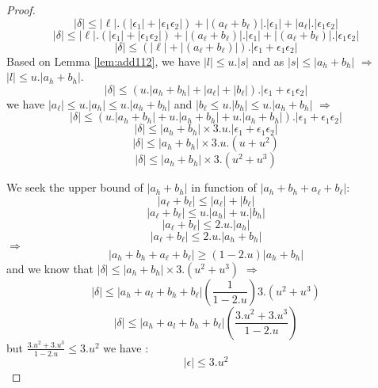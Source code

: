\begin{proof}
$$ \lvert \delta \rvert \le \lvert \ell \rvert .( \lvert \epsilon_1 \rvert+  \lvert \epsilon_1 \epsilon_2\rvert) + \lvert (a_{\ell} + b_{\ell}) \rvert. \lvert \epsilon_1 \rvert + \lvert  a_{\ell} \rvert.\lvert \epsilon_1 \epsilon_2 \rvert $$ 
$$ \lvert \delta \rvert \le \lvert \ell \rvert .(\lvert \epsilon_1 \rvert+  \lvert \epsilon_1 \epsilon_2 \rvert) + \lvert (a_{\ell} + b_{\ell}) \rvert .\lvert \epsilon_1 \rvert  + \lvert  (a_{\ell} + b_{\ell}) \rvert .\lvert \epsilon_1 \epsilon_2 \rvert $$ 
$$ \lvert \delta \rvert \le (\lvert \ell \rvert  + \lvert (a_{\ell} + b_{\ell}) \rvert) .\lvert \epsilon_1+ \epsilon_1 \epsilon_2 \rvert$$ 
Based on Lemma \ref{lem:add112}, we have $\lvert l \rvert \le u.\lvert s \rvert $ and as $\lvert s \rvert \le \lvert a_h + b_h \rvert $ $\Rightarrow$ $\lvert l \rvert \le u.\lvert a_h + b_h \rvert $.\\
$$\lvert \delta \rvert \le (u. \lvert a_h + b_h \rvert + \lvert a_{\ell} \rvert + \lvert b_{\ell} \rvert) .\lvert \epsilon_1+ \epsilon_1 \epsilon_2 \rvert$$
we have $\lvert a_{\ell} \rvert \le u. \lvert a_h \rvert \le u. \lvert a_h  + b_h\rvert$ and  $\lvert b_{\ell} \le u. \lvert b_h \rvert \le u. \lvert a_h  + b_h\rvert$ $\Rightarrow$
$$\lvert \delta \rvert \le (u. \lvert a_h + b_h \rvert + u. \lvert a_h + b_h \rvert + u. \lvert a_h + b_h \rvert) .\lvert \epsilon_1+ \epsilon_1 \epsilon_2 \rvert$$
$$\lvert \delta \rvert \le \lvert a_h + b_h \rvert \times  3 .u .\lvert \epsilon_1+ \epsilon_1 \epsilon_2 \rvert$$
$$\lvert \delta \rvert \le \lvert a_h + b_h \rvert \times  3 .u. ( u+ u^2)$$
$$\lvert \delta \rvert \le \lvert a_h + b_h \rvert \times  3  .( u^2+ u^3)$$

We seek the upper bound of $\lvert a_h + b_h \rvert$  in function of $ \lvert a_h + b_h + a_{\ell} + b_{\ell} \rvert $:\\
$$\lvert a_{\ell} + b_{\ell} \rvert \le \lvert a_{\ell} \rvert + \lvert b_{\ell} \rvert $$
$$ \lvert a_{\ell} + b_{\ell} \rvert \le u.\lvert a_h \rvert + u.\lvert b_h \rvert $$
$$ \lvert a_{\ell} + b_{\ell} \rvert \le 2.u.\lvert a_h \rvert $$
$$ \lvert a_{\ell} + b_{\ell} \rvert \le 2.u.\lvert a_h + b_h\rvert $$
$\Rightarrow$
$$ \lvert  a_h + b_h + a_{\ell} + b_{\ell} \rvert \ge (1 - 2.u)\lvert a_h + b_h\rvert $$
and we know that $\lvert \delta \rvert \le \lvert a_h + b_h \rvert \times  3 .( u^2+ u^3)$ $\Rightarrow$
 $$\lvert \delta \rvert \le \lvert a_h +a_l + b_h + b_{\ell} \rvert (\frac{1}{1-2.u}) 3 .( u^2+ u^3)$$
 $$\lvert \delta \rvert \le \lvert a_h +a_l + b_h + b_{\ell} \rvert (\frac{ 3.u^2+ 3.u^3}{1-2.u})$$
 but $\frac{ 3.u^2+ 3.u^3}{1-2.u} \le 3.u^2$
  we have :\\
 $$\lvert \epsilon \rvert \le 3.u^2$$
\end{proof}

